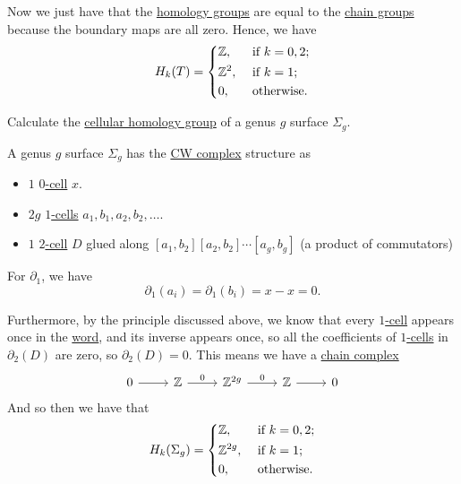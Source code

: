 \begin{explanation}
	Now we just have that the \hyperref[def:cellular-homology-group]{homology groups} are equal to the \hyperref[def:cellular-chain-complex]{chain groups}
	because the boundary maps are all zero. Hence, we have
	\[
		H_{k}(T) = \begin{dcases}
			\mathbb{Z} ,     & \text{ if } k = 0, 2 ; \\
			\mathbb{Z} ^{2}, & \text{ if } k = 1;     \\
			0,               & \text{ otherwise}.
		\end{dcases}
	\]
\end{explanation}

\begin{eg}
	Calculate the \hyperref[def:cellular-homology-group]{cellular homology group} of a genus \(g\) surface \(\Sigma _g\).
\end{eg}
\begin{explanation}
	A genus \(g\) surface \(\Sigma_g\) has the \hyperref[def:CW-Complex]{CW complex} structure as
	\begin{itemize}
		\item \(1\) \hyperref[def:cell]{\(0\)-cell} \(x\).
		\item \(2g\) \hyperref[def:cell]{\(1\)-cells} \(a_1, b_1, a_2, b_2, \dots\).
		\item \(1\) \hyperref[def:cell]{\(2\)-cell} \(D\) glued along \([a_1, b_2][a_2, b_2]\cdots[a_g, b_g]\) (a product of commutators)
	\end{itemize}

	For \(\partial _1\), we have
	\[
		\partial_1(a_i) = \partial_1(b_i) = x - x = 0.
	\]

	Furthermore, by the principle discussed above, we know that every \hyperref[def:cell]{\(1\)-cell} appears once in the \hyperref[def:word]{word}, and its inverse appears once,
	so all the coefficients of \hyperref[def:cell]{\(1\)-cells} in \(\partial_2(D)\) are zero, so \(\partial_2(D) = 0\). This means we have a \hyperref[def:cellular-chain-complex]{chain complex}
	\[
		\begin{tikzcd}
			0 & {\mathbb{Z}} & {\mathbb{Z}^{2g}} & {\mathbb{Z}} & 0
			\arrow[from=1-1, to=1-2]
			\arrow["0", from=1-2, to=1-3]
			\arrow["0", from=1-3, to=1-4]
			\arrow[from=1-4, to=1-5]
		\end{tikzcd}
	\]
	And so then we have that
	\[
		H_k(\Sigma _{g} ) = \begin{dcases}
			\mathbb{Z} ,      & \text{ if } k = 0, 2 ; \\
			\mathbb{Z} ^{2g}, & \text{ if } k = 1;     \\
			0,                & \text{ otherwise}.
		\end{dcases}
	\]
\end{explanation}

